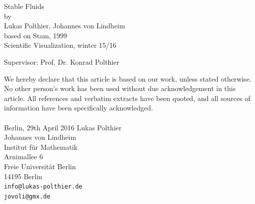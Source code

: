 \documentclass[a4paper,10pt,oneside,final,german,openbib,pdftex,titlepage]{scrbook}
\begin{document}

\linespread{0.9}

\begin{titlepage}

  \vspace*{6mm}
  \begin{center}
     {\afont Stable Fluids}
     \\[3.5cm]
     {\large by}
     \\[3.5cm]
     {\dfont Lukas Polthier, Johannes von Lindheim}\\
     {based on Stam, 1999}
     \\[2cm]
     {\large Scientific Visualization, winter 15/16\/\\
}
   \end{center}
   \vfill
   Supervisor: Prof. Dr. Konrad Polthier\\	
   \vfill
   
   
\end{titlepage}

\newpage
\mbox{}
\thispagestyle{empty}

\newpage
\thispagestyle{empty}
We hereby declare that this article is based on our work, unless stated otherwise. No other person’s work has been used without due acknowledgement in this article. All references and verbatim extracts have been quoted, and all sources of information have been specifically acknowledged.
\\
\\[3.5cm] 
Berlin, 29th April 2016
\vfill
\noindent 
Lukas Polthier\\
Johannes von Lindheim\\
Institut f\"ur Mathematik\\
Arnimallee 6\\
Freie Universit\"at Berlin\\
14195 Berlin\\
{\tt info@lukas-polthier.de\\
\tt jovoli@gmx.de}

\thispagestyle{empty}
\renewcommand\contentsname{Table of Contents}
\thispagestyle{empty}
\renewcommand\figurename{Figure}
\renewcommand\tablename{Tabelle}
\thispagestyle{empty}
\tableofcontents
\thispagestyle{empty}
\clearpage
\thispagestyle{empty}
\end{document}
